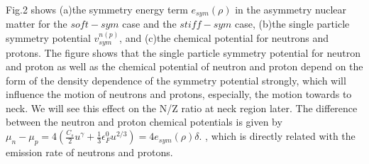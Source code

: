 \documentclass[aps,prc,groupedaddress,showpacs,manuscript]{revtex4}
\begin{document}
Fig.2 shows (a)the symmetry energy term $e_{sym}(\rho)$ in the
asymmetry nuclear matter for the $soft-sym$ case and the
$stiff-sym$ case, (b)the single particle symmetry potential
$v^{n(p)}_{sym}$, and (c)the chemical potential for neutrons and
protons. The figure shows that the single particle symmetry
potential for neutron and proton as well as the chemical potential
of neutron and proton depend on the form of the density dependence
of the symmetry potential strongly, which will influence the
motion of neutrons and protons, especially, the motion towards to
neck. We will see this effect on the N/Z ratio at neck region
later. The difference between the neutron and proton chemical
potentials is given by
$\mu_{n}-\mu_{p}=4(\frac{C_{s}}{2}u^{\gamma}+\frac{1}{3}\epsilon^{0}_{F}u^{2/3})=4e_{sym}(\rho)\delta$.
, which is directly related with the emission rate of neutrons and
protons.
\end{document}
